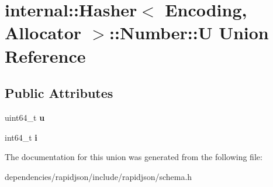 \hypertarget{unioninternal_1_1_hasher_1_1_number_1_1_u}{}\section{internal\+:\+:Hasher$<$ Encoding, Allocator $>$\+:\+:Number\+:\+:U Union Reference}
\label{unioninternal_1_1_hasher_1_1_number_1_1_u}
\subsection*{Public Attributes}
\begin{DoxyCompactItemize}
\item 
\mbox{\label{unioninternal_1_1_hasher_1_1_number_1_1_u_a6380a48b72a4bb5dd7291d47814e6421}} 
uint64\+\_\+t {\bfseries u}
\item 
\mbox{\label{unioninternal_1_1_hasher_1_1_number_1_1_u_a19099b91768e67f02ed5a27fc157974b}} 
int64\+\_\+t {\bfseries i}
\end{DoxyCompactItemize}


The documentation for this union was generated from the following file\+:\begin{DoxyCompactItemize}
\item 
dependencies/rapidjson/include/rapidjson/schema.\+h\end{DoxyCompactItemize}
